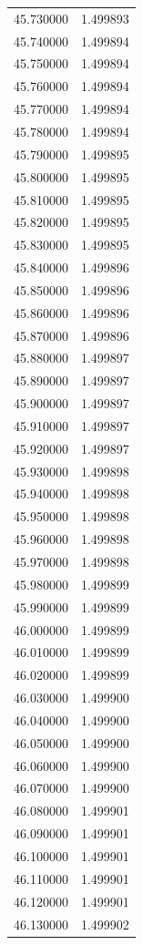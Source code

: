 \begin{tabular}{rr}
45.730000 & 1.499893 \\
45.740000 & 1.499894 \\
45.750000 & 1.499894 \\
45.760000 & 1.499894 \\
45.770000 & 1.499894 \\
45.780000 & 1.499894 \\
45.790000 & 1.499895 \\
45.800000 & 1.499895 \\
45.810000 & 1.499895 \\
45.820000 & 1.499895 \\
45.830000 & 1.499895 \\
45.840000 & 1.499896 \\
45.850000 & 1.499896 \\
45.860000 & 1.499896 \\
45.870000 & 1.499896 \\
45.880000 & 1.499897 \\
45.890000 & 1.499897 \\
45.900000 & 1.499897 \\
45.910000 & 1.499897 \\
45.920000 & 1.499897 \\
45.930000 & 1.499898 \\
45.940000 & 1.499898 \\
45.950000 & 1.499898 \\
45.960000 & 1.499898 \\
45.970000 & 1.499898 \\
45.980000 & 1.499899 \\
45.990000 & 1.499899 \\
46.000000 & 1.499899 \\
46.010000 & 1.499899 \\
46.020000 & 1.499899 \\
46.030000 & 1.499900 \\
46.040000 & 1.499900 \\
46.050000 & 1.499900 \\
46.060000 & 1.499900 \\
46.070000 & 1.499900 \\
46.080000 & 1.499901 \\
46.090000 & 1.499901 \\
46.100000 & 1.499901 \\
46.110000 & 1.499901 \\
46.120000 & 1.499901 \\
46.130000 & 1.499902 \\

\end{tabular}
